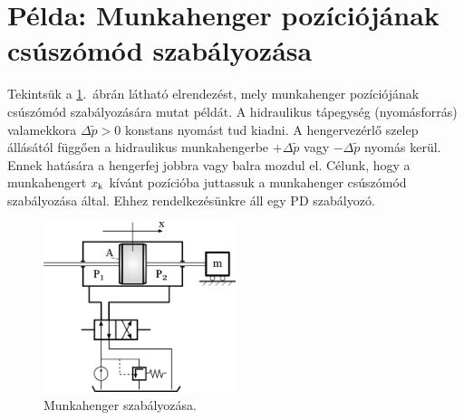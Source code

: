 \section{Példa: Munkahenger pozíciójának csúszómód szabályozása}

Tekintsük a \ref{fig:munkahenger}.~ábrán látható elrendezést, mely munkahenger pozíciójának csúszómód szabályozására mutat példát. A hidraulikus tápegység (nyomásforrás) valamekkora $\Delta \tilde{p}>0$ konstans nyomást tud kiadni. A hengervezérlő szelep állásától függően a hidraulikus munkahengerbe $+\Delta \tilde{p}$ vagy $-\Delta \tilde{p}$ nyomás kerül. Ennek hatására a hengerfej jobbra vagy balra mozdul el. Célunk, hogy a munkahengert $x_{\rm k}$ kívánt pozícióba juttassuk a munkahenger csúszómód szabályozása által. Ehhez rendelkezésünkre áll egy PD szabályozó.

\begin{figure}[!h]
\centering
\includegraphics[width=0.5\textwidth]{graphics/munkahenger_fancy.png}
\caption{Munkahenger szabályozása.}
\label{fig:munkahenger}
\end{figure}

